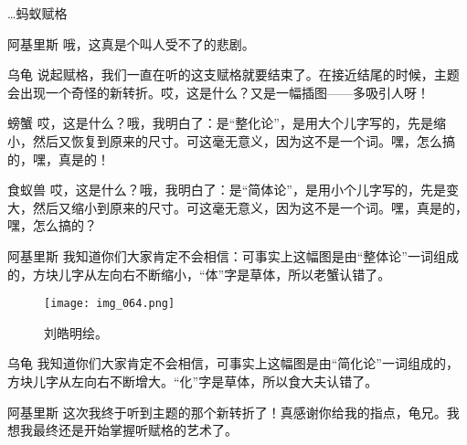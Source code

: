 \begin{dialog}{…蚂蚁赋格}
\begin{dialogue}
\item[阿基里斯]哦，这真是个叫人受不了的悲剧。

\item[乌龟]说起赋格，我们一直在听的这支赋格就要结束了。在接近结尾的时候，主题会出现一个奇怪的新转折。哎，这是什么？又是一幅插图——多吸引人呀！

\item[螃蟹]哎，这是什么？哦，我明白了：是“整化论”，是用大个儿字写的，先是缩小，然后又恢复到原来的尺寸。可这毫无意义，因为这不是一个词。嘿，怎么搞的，嘿，真是的！

\item[食蚁兽]哎，这是什么？哦，我明白了：是“简体论”，是用小个儿字写的，先是变大，然后又缩小到原来的尺寸。可这毫无意义，因为这不是一个词。嘿，真是的，嘿，怎么搞的？

\item[阿基里斯]我知道你们大家肯定不会相信：可事实上这幅图是由“整体论”一词组成的，方块儿字从左向右不断缩小，“体”字是草体，所以老蟹认错了。

\begin{figure}
\texttt{[image: img\_064.png]}
\caption[一支整体论—简化论的“螺旋桨”。]
  {刘皓明绘。}
\end{figure}

\item[乌龟]我知道你们大家肯定不会相信，可事实上这幅图是由“简化论”一词组成的，方块儿字从左向右不断增大。“化”字是草体，所以食大夫认错了。

\item[阿基里斯]这次我终于听到主题的那个新转折了！真感谢你给我的指点，龟兄。我想我最终还是开始掌握听赋格的艺术了。

\end{dialogue}

\end{dialog}
